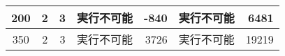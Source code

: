 \documentclass[a4j,11pt,twocolumn]{jsarticle}
\begin{document}
\begin{landscape}
\begin{table}[]
\begin{tabular}{|c|c|c|r|r|r|r|}
  200 & 2                                                & 3                                                & 実行不可能                                                                    & -840                                                                      & 実行不可能                  & 6481                      \\ \hline
  350 & 2                                                & 3                                                & 実行不可能                                                                    & 3726                                                                      & 実行不可能                  & 19219                     \\ \hline
  \end{tabular}
\end{table}
\end{landscape}
\end{document}
